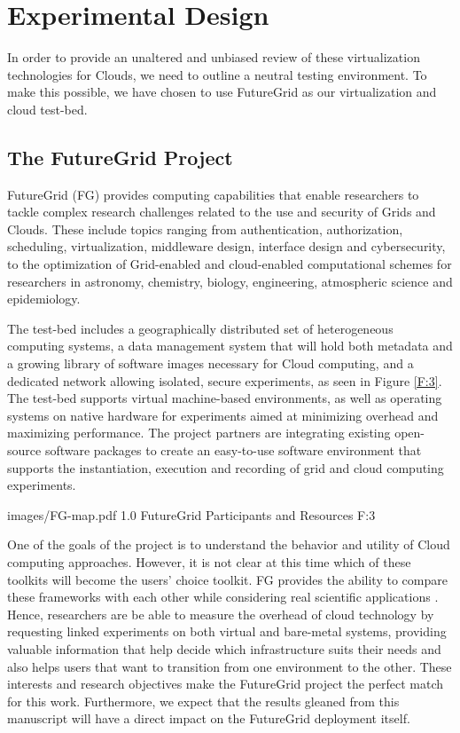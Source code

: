 \section{Experimental Design}

In order to provide an unaltered and unbiased review of these virtualization technologies for Clouds, we need to outline a neutral testing environment.  To make this possible, we have chosen to use FutureGrid as our virtualization and cloud test-bed.  


\subsection{The FutureGrid Project}

FutureGrid (FG) \cite{www-fg} provides computing capabilities that enable researchers to tackle complex research challenges related to the use and security of Grids and Clouds. These include topics ranging from authentication, authorization, scheduling, virtualization, middleware design, interface design and cybersecurity, to the optimization of Grid-enabled and cloud-enabled computational schemes for researchers in astronomy, chemistry, biology, engineering, atmospheric science and epidemiology. 

The test-bed includes a geographically distributed set of heterogeneous computing systems, a data management system that will hold both metadata and a growing library of software images necessary for Cloud computing, and a dedicated network allowing isolated, secure experiments, as seen in Figure \ref{F:3}. The test-bed supports virtual machine-based environments, as well as operating systems on native hardware for experiments aimed at minimizing overhead and maximizing performance. The project partners are integrating existing open-source software packages to create an easy-to-use software environment that supports the instantiation, execution and recording of grid and cloud computing experiments.


  {images/FG-map.pdf}
  {1.0}
  {FutureGrid Participants and Resources}
  {F:3}


One of the goals of the project is to understand the behavior and utility of Cloud computing approaches.  However, it is not clear at this time which of these toolkits will become the users' choice toolkit. FG provides the ability to compare these frameworks with each other while considering real scientific applications \cite{las2010gce}. Hence, researchers are be able to measure the overhead of cloud technology by requesting linked experiments on both virtual and bare-metal systems, providing valuable information that help decide which infrastructure suits their needs and also helps users that want to transition from one environment to the other.  These interests and research objectives make the FutureGrid project the perfect match for this work.  Furthermore, we expect that the results gleaned from this manuscript will have a direct impact on the FutureGrid deployment itself.  

